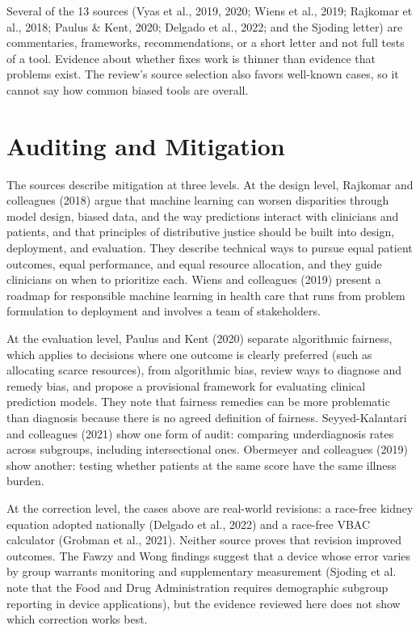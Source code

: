 \documentclass[12pt]{article}
\begin{document}
Several of the 13 sources (Vyas et al., 2019, 2020; Wiens et al., 2019; Rajkomar et al., 2018; Paulus \& Kent, 2020; Delgado et al., 2022; and the Sjoding letter) are commentaries, frameworks, recommendations, or a short letter and not full tests of a tool. Evidence about whether fixes work is thinner than evidence that problems exist. The review's source selection also favors well-known cases, so it cannot say how common biased tools are overall.

\section*{Auditing and Mitigation}
The sources describe mitigation at three levels. At the design level, Rajkomar and colleagues (2018) argue that machine learning can worsen disparities through model design, biased data, and the way predictions interact with clinicians and patients, and that principles of distributive justice should be built into design, deployment, and evaluation. They describe technical ways to pursue equal patient outcomes, equal performance, and equal resource allocation, and they guide clinicians on when to prioritize each. Wiens and colleagues (2019) present a roadmap for responsible machine learning in health care that runs from problem formulation to deployment and involves a team of stakeholders.

At the evaluation level, Paulus and Kent (2020) separate algorithmic fairness, which applies to decisions where one outcome is clearly preferred (such as allocating scarce resources), from algorithmic bias, review ways to diagnose and remedy bias, and propose a provisional framework for evaluating clinical prediction models. They note that fairness remedies can be more problematic than diagnosis because there is no agreed definition of fairness. Seyyed-Kalantari and colleagues (2021) show one form of audit: comparing underdiagnosis rates across subgroups, including intersectional ones. Obermeyer and colleagues (2019) show another: testing whether patients at the same score have the same illness burden.

At the correction level, the cases above are real-world revisions: a race-free kidney equation adopted nationally (Delgado et al., 2022) and a race-free VBAC calculator (Grobman et al., 2021). Neither source proves that revision improved outcomes. The Fawzy and Wong findings suggest that a device whose error varies by group warrants monitoring and supplementary measurement (Sjoding et al. note that the Food and Drug Administration requires demographic subgroup reporting in device applications), but the evidence reviewed here does not show which correction works best.
\end{document}

